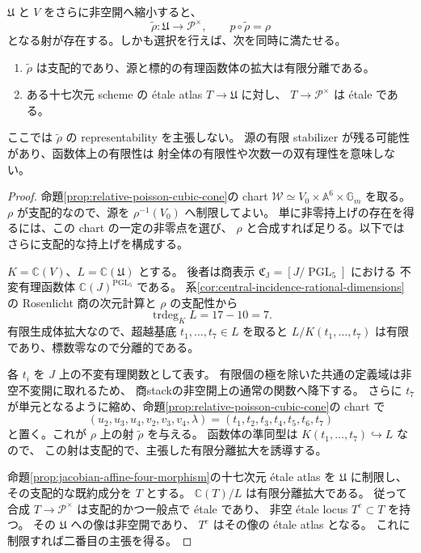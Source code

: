 \begin{proposition}[相対有理座標による非標準的Poisson持上げ]
\label{thm:noncanonical-poisson-cubic-lift}
$\mathfrak U$ と $V$ をさらに非空開へ縮小すると、
\[
 \widetilde\rho:\mathfrak U\longrightarrow\mathcal P^\times,
 \qquad p\circ\widetilde\rho=\rho
\]
となる射が存在する。しかも選択を行えば、次を同時に満たせる。
\begin{enumerate}
\item $\widetilde\rho$ は支配的であり、源と標的の有理函数体の拡大は有限分離である。
\item ある十七次元 scheme の étale atlas $T\to\mathfrak U$ に対し、
$T\to\mathcal P^\times$ は étale である。
\end{enumerate}
ここでは $\widetilde\rho$ の representability を主張しない。
源の有限 stabilizer が残る可能性があり、函数体上の有限性は
射全体の有限性や次数一の双有理性を意味しない。
\end{proposition}
\begin{proof}
命題\ref{prop:relative-poisson-cubic-cone}の chart $\mathcal W\simeq V_0\times\mathbb A^6\times\mathbb G_m$ を取る。
$\rho$ が支配的なので、源を $\rho^{-1}(V_0)$ へ制限してよい。
単に非零持上げの存在を得るには、この chart の一定の非零点を選び、
$\rho$ と合成すれば足りる。以下ではさらに支配的な持上げを構成する。

$K=\mathbb C(V)$、$L=\mathbb C(\mathfrak U)$ とする。
後者は商表示 $\mathfrak C_{\mathrm J}=[J/\operatorname{PGL}_5]$ における
不変有理函数体 $\mathbb C(J)^{\operatorname{PGL}_5}$ である。
系\ref{cor:central-incidence-rational-dimensions}の Rosenlicht 商の次元計算と
$\rho$ の支配性から
\[
 \operatorname{trdeg}_K L=17-10=7.
\]
有限生成体拡大なので、超越基底 $t_1,\ldots,t_7\in L$ を取ると
$L/K(t_1,\ldots,t_7)$ は有限であり、標数零なので分離的である。

各 $t_i$ を $J$ 上の不変有理関数として表す。
有限個の極を除いた共通の定義域は非空不変開に取れるため、
商stackの非空開上の通常の関数へ降下する。
さらに $t_7$ が単元となるように縮め、命題\ref{prop:relative-poisson-cubic-cone}の chart で
\[
 (u_2,u_3,u_4,v_2,v_3,v_4,\lambda)
 =(t_1,t_2,t_3,t_4,t_5,t_6,t_7)
\]
と置く。これが $\rho$ 上の射 $\widetilde\rho$ を与える。
函数体の準同型は $K(t_1,\ldots,t_7)\hookrightarrow L$ なので、
この射は支配的で、主張した有限分離拡大を誘導する。

命題\ref{prop:jacobian-affine-four-morphism}の十七次元 étale atlas を
$\mathfrak U$ に制限し、その支配的な既約成分を $T$ とする。
$\mathbb C(T)/L$ は有限分離拡大である。
従って合成 $T\to\mathcal P^\times$ は支配的かつ一般点で étale であり、
非空 étale locus $T^e\subset T$ を持つ。
その $\mathfrak U$ への像は非空開であり、
$T^e$ はその像の étale atlas となる。
これに制限すれば二番目の主張を得る。
\end{proof}

